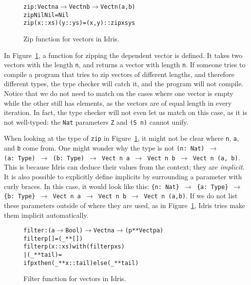 \begin{figure}
\begin{alltt}
zip : Vect n a \(\to\) Vect n b \(\to\) Vect n (a, b)
zip Nil       Nil       = Nil
zip (x :: xs) (y :: ys) = (x, y) :: zip xs ys
\end{alltt}
\caption{Zip function for vectors in Idris.}
\label{fig:zip}
\end{figure}

In Figure~\ref{fig:zip}, a function for zipping the dependent vector is defined. It takes two vectors with the length \texttt{n}, and returns a vector with length \texttt{n}. If someone tries to compile a program that tries to zip vectors of different lengths, and therefore different types, the type checker will catch it, and the program will not compile. Notice that we do not need to match on the cases where one vector is empty while the other still has elements, as the vectors are of equal length in every iteration. In fact, the type checker will not even let us match on this case, as it is not well-typed: the \texttt{Nat} parameters \texttt{Z} and \texttt{(S~n)} cannot unify.

When looking at the type of \texttt{zip} in Figure~\ref{fig:zip}, it might not be clear where \texttt{n}, \texttt{a}, and \texttt{b} come from. One might wonder why the type is not \texttt{(n:~Nat)~$\to$ (a:~Type)~$\to$ (b:~Type)~$\to$ Vect~n~a~$\to$ Vect~n~b~$\to$ Vect~n~(a,~b)}.\\ This is because Idris can deduce their values from the context; they are \emph{implicit}. It is also possible to explicitly define implicits by surrounding a parameter with curly braces. In this case, it would look like this: \texttt{\{n:~Nat\}~$\to$ \{a:~Type\}~$\to$ \{b:~Type\}~$\to$ Vect~n~a~$\to$ Vect~n~b~$\to$ Vect~n~(a,b)}. If we do not list these parameters outside of where they are used, as in Figure~\ref{fig:zip}, Idris tries make them implicit automatically.

\begin{figure}
\begin{alltt}
filter : (a \(\to\) Bool) \(\to\) Vect n a \(\to\) (p ** Vect p a)
filter p [] = ( _ ** [] )
filter p (x::xs) with (filter p xs)
  | (_ ** tail) =
    if p x then (_ ** x::tail) else (_ ** tail)
\end{alltt}
\caption{Filter function for vectors in Idris.}
\label{fig:filter}
\end{figure}

